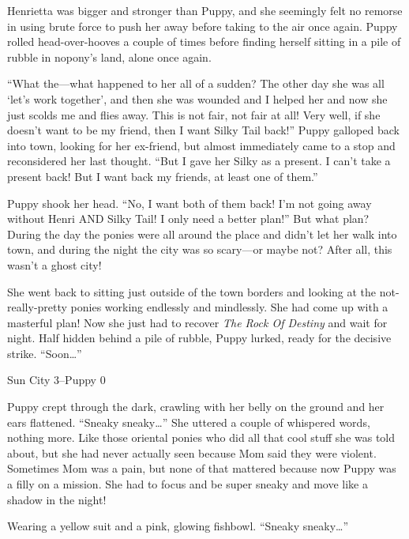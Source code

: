 Henrietta was bigger and stronger than Puppy, and she seemingly felt no remorse in using brute force to push her away before taking to the air once again. Puppy rolled head-over-hooves a couple of times before finding herself sitting in a pile of rubble in nopony's land, alone once again.

``What the---what happened to her all of a sudden? The other day she was all `let's work together', and then she was wounded and I helped her and now she just scolds me and flies away. This is not fair, not fair at all! Very well, if she doesn't want to be my friend, then I want Silky Tail back!'' Puppy galloped back into town, looking for her ex-friend, but almost immediately came to a stop and reconsidered her last thought. ``But I gave her Silky as a present. I can't take a present back! But I want back my friends, at least one of them.''

Puppy shook her head. ``No, I want both of them back! I'm not going away without Henri AND Silky Tail! I only need a better plan!'' But what plan? During the day the ponies were all around the place and didn't let her walk into town, and during the night the city was so scary---or maybe not? After all, this wasn't a ghost city!

She went back to sitting just outside of the town borders and looking at the not-really-pretty ponies working endlessly and mindlessly. She had come up with a masterful plan! Now she just had to recover \emph{The Rock Of Destiny} and wait for night. Half hidden behind a pile of rubble, Puppy lurked, ready for the decisive strike. ``Soon\dots''


\begin{center}
	Sun City 3--Puppy 0
\end{center}

\horizonline


Puppy crept through the dark, crawling with her belly on the ground and her ears flattened. ``Sneaky sneaky\dots'' She uttered a couple of whispered words, nothing more. Like those oriental ponies who did all that cool stuff she was told about, but she had never actually seen because Mom said they were violent. Sometimes Mom was a pain, but none of that mattered because now Puppy was a filly on a mission. She had to focus and be super sneaky and move like a shadow in the night!

Wearing a yellow suit and a pink, glowing fishbowl. ``Sneaky sneaky\dots''

